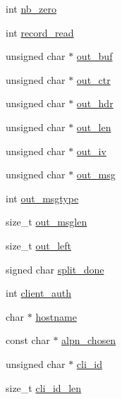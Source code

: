 \begin{DoxyCompactItemize}
\item 
int \mbox{\hyperlink{structmbedtls__ssl__context_a4b988651d1c7320f119d3d80f9af7d94}{nb\+\_\+zero}}
\item 
int \mbox{\hyperlink{structmbedtls__ssl__context_adfba71d6f510182482d73cd8f1ffbccd}{record\+\_\+read}}
\item 
unsigned char $\ast$ \mbox{\hyperlink{structmbedtls__ssl__context_a77df97cbed2923f1162034c6e9c2ad4d}{out\+\_\+buf}}
\item 
unsigned char $\ast$ \mbox{\hyperlink{structmbedtls__ssl__context_aa738cee1fd289e5c8686ab355d591203}{out\+\_\+ctr}}
\item 
unsigned char $\ast$ \mbox{\hyperlink{structmbedtls__ssl__context_a02d820fa0a4f09e5b5a69b71de4cc125}{out\+\_\+hdr}}
\item 
unsigned char $\ast$ \mbox{\hyperlink{structmbedtls__ssl__context_a492e5b5ecc58e0f68c7498eaa07fc273}{out\+\_\+len}}
\item 
unsigned char $\ast$ \mbox{\hyperlink{structmbedtls__ssl__context_ab2e382571a395990024d82a47dadf565}{out\+\_\+iv}}
\item 
unsigned char $\ast$ \mbox{\hyperlink{structmbedtls__ssl__context_a6398baeb1222e1b166531b8528800a20}{out\+\_\+msg}}
\item 
int \mbox{\hyperlink{structmbedtls__ssl__context_a847547cec75d00533c8c0373f6eaa759}{out\+\_\+msgtype}}
\item 
size\+\_\+t \mbox{\hyperlink{structmbedtls__ssl__context_aa004c925da73e2536e74ce8d36aefcb0}{out\+\_\+msglen}}
\item 
size\+\_\+t \mbox{\hyperlink{structmbedtls__ssl__context_a8b9ef7c3cfd17efdc2eacddf4dbfb409}{out\+\_\+left}}
\item 
signed char \mbox{\hyperlink{structmbedtls__ssl__context_a0b9cdd63126690b0071c5b1821153a5a}{split\+\_\+done}}
\item 
int \mbox{\hyperlink{structmbedtls__ssl__context_aac814a12725174dd9da1b1815b0abac0}{client\+\_\+auth}}
\item 
char $\ast$ \mbox{\hyperlink{structmbedtls__ssl__context_a32d4187f88ff6a5153cfd85c6a752cb9}{hostname}}
\item 
const char $\ast$ \mbox{\hyperlink{structmbedtls__ssl__context_a858fd8077042db3804cd2e4aef9e2f20}{alpn\+\_\+chosen}}
\item 
unsigned char $\ast$ \mbox{\hyperlink{structmbedtls__ssl__context_a25bf8a5a798a1082db3b1e0f40de6161}{cli\+\_\+id}}
\item 
size\+\_\+t \mbox{\hyperlink{structmbedtls__ssl__context_a2d748130fb769af23d736f462a0bc913}{cli\+\_\+id\+\_\+len}}

\end{DoxyCompactItemize}
